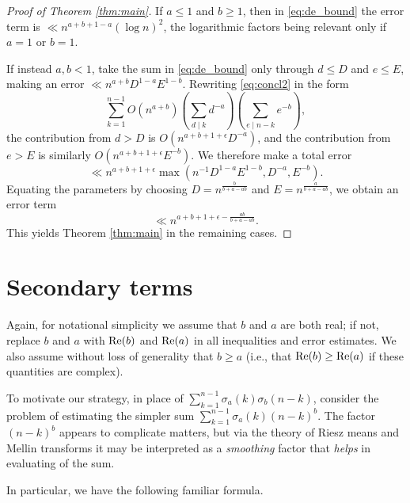 \documentclass[12pt]{amsart}
\numberwithin{equation}{section}
\numberwithin{theorem}{section}
\renewcommand\Re{\textnormal{Re}}
\begin{document}
\begin{proof}[Proof of Theorem \ref{thm:main}]
\medskip
If $a \leq 1$ and $b \geq 1$, then in \eqref{eq:de_bound} the error term
is $\ll n^{a + b + 1 - a} (\log n)^2$, the logarithmic factors being relevant only if $a=1$ or $b=1$.

If instead  $a, b < 1$, take the sum in \eqref{eq:de_bound} only through
$d \leq D$ and $e \leq E$, making an error $\ll n^{a + b} D^{1 - a} E^{1 - b}$.
Rewriting \eqref{eq:concl2} in the form
\begin{equation}\label{eq:concl2a}
\sum_{k = 1}^{n - 1} O(n^{a + b})
\left( \sum_{d \mid k} d^{-a} \right)
\left( \sum_{e \mid n - k} e^{-b} \right),
\end{equation}
the contribution from $d > D$ is $O(n^{a + b + 1 + \epsilon} D^{-a})$, and the contribution
from $e > E$ is similarly $O(n^{a + b + 1 + \epsilon} E^{-b})$. We therefore make a total error
\[
\ll 
n^{a + b + 1 + \epsilon} \max( n^{-1} D^{1 - a} E^{1 - b}, D^{-a}, E^{-b} ).
\]
Equating the parameters by choosing $D = n^{\frac{b}{b+a-ab}}$ and $E = n^{\frac{a}{b+a-ab}}$,
we obtain an error term
\[
\ll
n^{a + b + 1 + \epsilon - \frac{ab}{b+a-ab}}.
\]
This yields Theorem \ref{thm:main} in the remaining cases.
\end{proof}





\section{Secondary terms}\label{sec:st}

Again, for notational simplicity we assume that $b$ and $a$ are both real; if not, replace $b$ and $a$ with $\Re(b)$ and $\Re(a)$
in all inequalities and error estimates. 
We also assume without loss of generality that $b \geq a$ (i.e., that $\Re(b) \geq \Re(a)$ if these quantities are complex).

To motivate our strategy, in place of $\sum_{k = 1}^{n - 1} \sigma_a(k) \sigma_b(n - k)$, consider the problem
of estimating the simpler sum $\sum_{k = 1}^{n - 1} \sigma_a(k) (n - k)^b$. The  factor
$(n - k)^b$ appears to complicate matters, but
via the theory of Riesz means and Mellin transforms it may be interpreted as a {\itshape smoothing} factor that {\itshape helps} in evaluating of the sum.

In particular, we have the following familiar formula.
\end{document}
